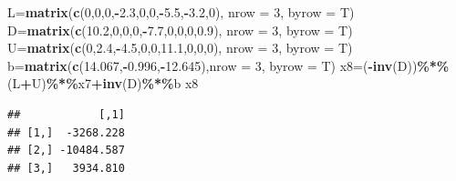 \documentclass[
]{article}
\newenvironment{Shaded}{\begin{snugshade}}{\end{snugshade}}
\newcommand{\AttributeTok}[1]{\textcolor[rgb]{0.13,0.29,0.53}{#1}}
\newcommand{\DecValTok}[1]{\textcolor[rgb]{0.00,0.00,0.81}{#1}}
\newcommand{\FloatTok}[1]{\textcolor[rgb]{0.00,0.00,0.81}{#1}}
\newcommand{\FunctionTok}[1]{\textcolor[rgb]{0.13,0.29,0.53}{\textbf{#1}}}
\newcommand{\NormalTok}[1]{#1}
\newcommand{\OtherTok}[1]{\textcolor[rgb]{0.56,0.35,0.01}{#1}}
\newcommand{\SpecialCharTok}[1]{\textcolor[rgb]{0.81,0.36,0.00}{\textbf{#1}}}
\begin{document}
\begin{Shaded}
\begin{Highlighting}[]
\NormalTok{  L}\OtherTok{=}\FunctionTok{matrix}\NormalTok{(}\FunctionTok{c}\NormalTok{(}\DecValTok{0}\NormalTok{,}\DecValTok{0}\NormalTok{,}\DecValTok{0}\NormalTok{,}\SpecialCharTok{{-}}\FloatTok{2.3}\NormalTok{,}\DecValTok{0}\NormalTok{,}\DecValTok{0}\NormalTok{,}\SpecialCharTok{{-}}\FloatTok{5.5}\NormalTok{,}\SpecialCharTok{{-}}\FloatTok{3.2}\NormalTok{,}\DecValTok{0}\NormalTok{), }\AttributeTok{nrow =} \DecValTok{3}\NormalTok{, }\AttributeTok{byrow =}\NormalTok{ T)}
\NormalTok{  D}\OtherTok{=}\FunctionTok{matrix}\NormalTok{(}\FunctionTok{c}\NormalTok{(}\FloatTok{10.2}\NormalTok{,}\DecValTok{0}\NormalTok{,}\DecValTok{0}\NormalTok{,}\DecValTok{0}\NormalTok{,}\SpecialCharTok{{-}}\FloatTok{7.7}\NormalTok{,}\DecValTok{0}\NormalTok{,}\DecValTok{0}\NormalTok{,}\DecValTok{0}\NormalTok{,}\FloatTok{0.9}\NormalTok{), }\AttributeTok{nrow =} \DecValTok{3}\NormalTok{, }\AttributeTok{byrow =}\NormalTok{ T)}
\NormalTok{  U}\OtherTok{=}\FunctionTok{matrix}\NormalTok{(}\FunctionTok{c}\NormalTok{(}\DecValTok{0}\NormalTok{,}\FloatTok{2.4}\NormalTok{,}\SpecialCharTok{{-}}\FloatTok{4.5}\NormalTok{,}\DecValTok{0}\NormalTok{,}\DecValTok{0}\NormalTok{,}\FloatTok{11.1}\NormalTok{,}\DecValTok{0}\NormalTok{,}\DecValTok{0}\NormalTok{,}\DecValTok{0}\NormalTok{), }\AttributeTok{nrow =} \DecValTok{3}\NormalTok{, }\AttributeTok{byrow =}\NormalTok{ T)}
\NormalTok{  b}\OtherTok{=}\FunctionTok{matrix}\NormalTok{(}\FunctionTok{c}\NormalTok{(}\FloatTok{14.067}\NormalTok{,}\SpecialCharTok{{-}}\FloatTok{0.996}\NormalTok{,}\SpecialCharTok{{-}}\FloatTok{12.645}\NormalTok{),}\AttributeTok{nrow =} \DecValTok{3}\NormalTok{, }\AttributeTok{byrow =}\NormalTok{ T)}
\NormalTok{  x8}\OtherTok{=}\NormalTok{(}\SpecialCharTok{{-}}\FunctionTok{inv}\NormalTok{(D))}\SpecialCharTok{\%*\%}\NormalTok{(L}\SpecialCharTok{+}\NormalTok{U)}\SpecialCharTok{\%*\%}\NormalTok{x7}\SpecialCharTok{+}\FunctionTok{inv}\NormalTok{(D)}\SpecialCharTok{\%*\%}\NormalTok{b}
\NormalTok{  x8}
\end{Highlighting}
\end{Shaded}

\begin{verbatim}
##            [,1]
## [1,]  -3268.228
## [2,] -10484.587
## [3,]   3934.810
\end{verbatim}
\end{document}
